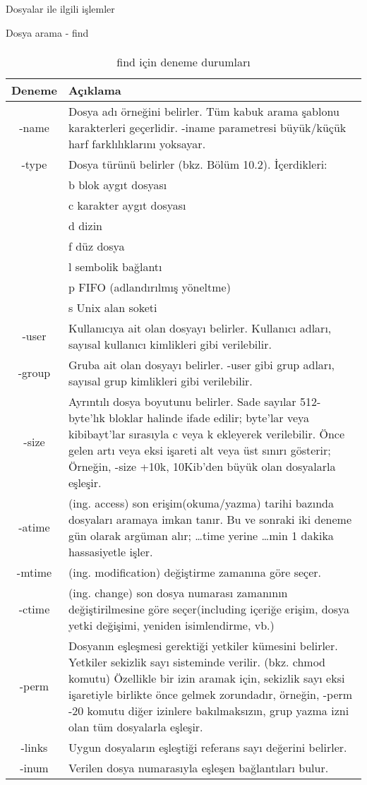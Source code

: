 \begin{section}{Dosyalar ile ilgili işlemler}
\begin{subsection}{Dosya arama - find}
\paragraph{}{
\begin {table}[H]
\caption {find için deneme durumları} \label{tab:title} 
\begin{tabular}{c l}
\hline
Deneme & Açıklama \\
\hline
-name & Dosya adı örneğini belirler. Tüm kabuk arama şablonu karakterleri geçerlidir. -iname parametresi büyük/küçük harf farklılıklarını yoksayar. \\
-type & Dosya türünü belirler (bkz. Bölüm 10.2). İçerdikleri:\\
 & b blok aygıt dosyası\\
 & c karakter aygıt dosyası\\
 & d dizin\\
 & f düz dosya\\
 & l sembolik bağlantı\\
 & p FIFO (adlandırılmış yöneltme)\\
 & s Unix alan soketi\\
-user & Kullanıcıya ait olan dosyayı belirler. Kullanıcı adları, sayısal kullanıcı kimlikleri gibi verilebilir.\\
-group & Gruba ait olan dosyayı belirler. -user gibi grup adları, sayısal grup kimlikleri gibi verilebilir.\\
-size & Ayrıntılı dosya boyutunu belirler. Sade sayılar 512-byte'lık bloklar halinde ifade edilir; byte'lar veya kibibayt'lar sırasıyla c veya k ekleyerek verilebilir. Önce gelen artı veya eksi işareti alt veya üst sınırı gösterir; Örneğin, -size +10k, 10Kib'den büyük olan dosyalarla eşleşir.\\
-atime & (ing. access) son erişim(okuma/yazma) tarihi bazında dosyaları aramaya imkan tanır.  Bu ve sonraki iki deneme gün olarak argüman alır; …time yerine …min 1 dakika hassasiyetle işler.\\
-mtime & (ing. modification) değiştirme zamanına göre seçer.\\
-ctime & (ing. change) son dosya numarası zamanının değiştirilmesine göre seçer(including içeriğe erişim, dosya yetki değişimi, yeniden isimlendirme, vb.)\\
-perm & Dosyanın eşleşmesi gerektiği yetkiler kümesini belirler. Yetkiler sekizlik sayı sisteminde verilir. (bkz. chmod komutu)
Özellikle bir izin aramak için, sekizlik sayı eksi işaretiyle birlikte önce gelmek zorundadır, örneğin, -perm -20 komutu diğer izinlere bakılmaksızın, grup yazma izni olan tüm dosyalarla eşleşir.\\
-links & Uygun dosyaların eşleştiği referans sayı değerini belirler.\\
-inum & Verilen dosya numarasıyla eşleşen bağlantıları bulur.\\
\hline
\end{tabular}
\end {table}
}

\end{subsection}
\end{section}
